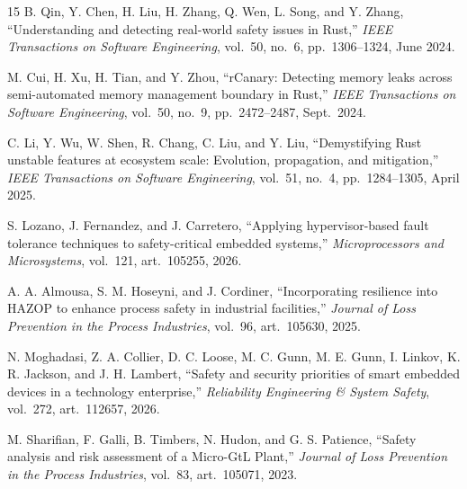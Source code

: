 \documentclass[11pt,a4paper]{article}
\begin{document}
\begin{thebibliography}{15}
B. Qin, Y. Chen, H. Liu, H. Zhang, Q. Wen, L. Song, and Y. Zhang,
``Understanding and detecting real-world safety issues in Rust,''
\textit{IEEE Transactions on Software Engineering}, vol.\ 50, no.\ 6, pp.\ 1306--1324, June 2024.

M. Cui, H. Xu, H. Tian, and Y. Zhou,
``rCanary: Detecting memory leaks across semi-automated memory management boundary in Rust,''
\textit{IEEE Transactions on Software Engineering}, vol.\ 50, no.\ 9, pp.\ 2472--2487, Sept.\ 2024.

C. Li, Y. Wu, W. Shen, R. Chang, C. Liu, and Y. Liu,
``Demystifying Rust unstable features at ecosystem scale: Evolution, propagation, and mitigation,''
\textit{IEEE Transactions on Software Engineering}, vol.\ 51, no.\ 4, pp.\ 1284--1305, April 2025.

S. Lozano, J. Fernandez, and J. Carretero,
``Applying hypervisor-based fault tolerance techniques to safety-critical embedded systems,''
\textit{Microprocessors and Microsystems}, vol.\ 121, art.\ 105255, 2026.

A. A. Almousa, S. M. Hoseyni, and J. Cordiner,
``Incorporating resilience into HAZOP to enhance process safety in industrial facilities,''
\textit{Journal of Loss Prevention in the Process Industries}, vol.\ 96, art.\ 105630, 2025.

N. Moghadasi, Z. A. Collier, D. C. Loose, M. C. Gunn, M. E. Gunn, I. Linkov, K. R. Jackson, and J. H. Lambert,
``Safety and security priorities of smart embedded devices in a technology enterprise,''
\textit{Reliability Engineering \& System Safety}, vol.\ 272, art.\ 112657, 2026.

M. Sharifian, F. Galli, B. Timbers, N. Hudon, and G. S. Patience,
``Safety analysis and risk assessment of a Micro-GtL Plant,''
\textit{Journal of Loss Prevention in the Process Industries}, vol.\ 83, art.\ 105071, 2023.

\end{thebibliography}
\end{document}

